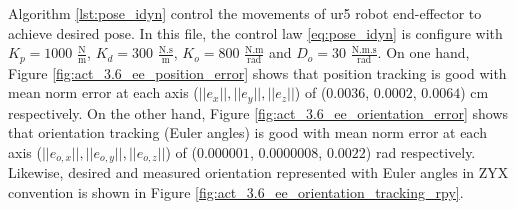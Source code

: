 Algorithm \ref{lst:pose_idyn} control the movements of ur5 robot end-effector to achieve desired pose. In this file, the control law \ref{eq:pose_idyn} is configure with ${K_{p}}=1000$ $\mathrm{\frac{N}{m}}$, $K_{d}= 300$ $\mathrm{\frac{N.s}{m}}$, ${K_{o}}=800$ $\mathrm{\frac{N.m}{rad}}$ and $D_{o}= 30$ $\mathrm{\frac{N.m.s}{rad}}$. On one hand, Figure \ref{fig:act_3.6_ee_position_error} shows that position tracking is good with mean norm error at each axis ($||e_x||, ||e_y||, ||e_z||$) of ($0.0036$, $0.0002$, $0.0064$) cm respectively. On the other hand, Figure \ref{fig:act_3.6_ee_orientation_error} shows that orientation tracking (Euler angles) is good with mean norm error at each axis ($||e_{o,x}||, ||e_{o,y}||, ||e_{o,z}||$) of ($0.000001$, $0.0000008$, $0.0022$) rad respectively. Likewise, desired and measured orientation represented with Euler angles in ZYX convention is shown in Figure \ref{fig:act_3.6_ee_orientation_tracking_rpy}. \vspace{.5cm}


